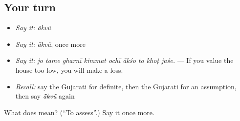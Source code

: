 \subsection*{Your turn}
\begin{itemize}
\raggedright
  \item \emph{Say it:} \emph{ā̃kvũ}
  \item \emph{Say it:} \emph{ā̃kvũ}, once more
  \item \emph{Say it:} \emph{jo tame gharnī kimmat ochī ā̃kśo to khoṭ jaśe.} — If you value the house too low, you will make a loss.
  \item \emph{Recall:} say the Gujarati for definite, then the Gujarati for an assumption, then say \emph{ā̃kvũ} again
\end{itemize}

\begin{tcolorbox}[breakable,colback=teal!4,colframe=teal!35!black,title={Before you move on}]
What does  mean? (\textquotedblleft{}To assess\textquotedblright{}.) Say it once more.
\end{tcolorbox}
